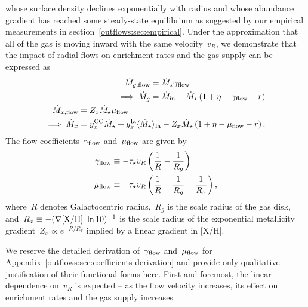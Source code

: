 whose surface density declines exponentially with radius and whose abundance
gradient has reached some steady-state equilibrium as suggested by our
empirical measurements in section~\ref{outflows:sec:empirical}.
Under the approximation that all of the gas is moving inward with the same
velocity~$v_R$, we demonstrate that the impact of radial flows on enrichment
rates and the gas supply can be expressed as
\begin{subequations}\begin{align}
\begin{split}
\dot{M}_{g,\text{flow}} &= \dot{M}_\star \gamma_{\text{flow}}
\\
\implies \dot{M}_g &= \dot{M}_\text{in} - \dot{M}_\star
\left(1 + \eta - \gamma_{\text{flow}} - r\right)
\label{outflows:eq:mdot-gas-flow}
\end{split}
\\
\begin{split}
\dot{M}_{x,\text{flow}} &= Z_x \dot{M}_\star \mu_{\text{flow}}
\\
\implies \dot{M}_x &= y_\text{$x$}^\text{CC} \dot{M}_\star +
y_\text{$x$}^\text{Ia} \langle \dot{M}_\star \rangle_\text{Ia} -
Z_x \dot{M}_\star \left(1 + \eta - \mu_{\text{flow}} - r\right).
\label{outflows:eq:mdot-element-flow}
\end{split}
\end{align}\end{subequations}
The flow coefficients~$\gamma_{\text{flow}}$ and~$\mu_{\text{flow}}$ are given by
\begin{subequations}\begin{align}
\gamma_{\text{flow}} &\equiv -\tau_\star v_R
\left(\frac{1}{R} - \frac{1}{R_g}\right)
\label{outflows:eq:gamma-flow}
\\
\mu_{\text{flow}} &\equiv -\tau_\star v_R
\left(\frac{1}{R} - \frac{1}{R_g} - \frac{1}{R_x}\right),
\label{outflows:eq:mu-flow}
\end{align}\end{subequations}
where~$R$ denotes Galactocentric radius,~$R_g$ is the scale radius of the gas
disk, and~$R_x \equiv -(\nabla\text{[X/H]}~\ln 10)^{-1}$ is the scale radius of the
exponential metallicity gradient~$Z_x \propto e^{-R / R_x}$ implied by a linear
gradient in [X/H].
\par
We reserve the detailed derivation of~$\gamma_{\text{flow}}$ and~$\mu_{\text{flow}}$ for
Appendix~\ref{outflows:sec:coefficients-derivation} and provide only
qualitative justification of their functional forms here.
First and foremost, the linear dependence on~$v_R$ is expected -- as the flow
velocity increases, its effect on enrichment rates and the gas supply increases
